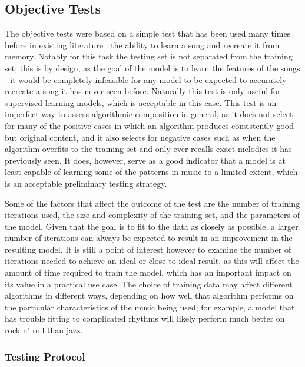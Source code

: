 \documentclass[ author={Stephen Livermore-Tozer},
				supervisor={Dr. Peter Flach},
				degree={MEng},
				title={Algorithmic Co-composition Using Machine Learning},
				subtitle={},
				type={research},
				year={2016} ]{dissertation}
\begin{document}
	\subsection{Objective Tests}
	\label{sec:objective-analysis}
	
	The objective tests were based on a simple test that has been used many times before in existing literature \cite{todd1989connectionist,franklin2006recurrent,paiement2007generative}: the ability to learn a song and recreate it from memory. Notably for this task the testing set is not separated from the training set; this is by design, as the goal of the model is to learn the features of the songs - it would be completely infeasible for any model to be expected to accurately recreate a song it has never seen before. Naturally this test is only useful for supervised learning models, which is acceptable in this case. This test is an imperfect way to assess algorithmic composition in general, as it does not select for many of the positive cases in which an algorithm produces consistently good but original content, and it also selects for negative cases such as when the algorithm overfits to the training set and only ever recalls exact melodies it has previously seen. It does, however, serve as a good indicator that a model is at least capable of learning some of the patterns in music to a limited extent, which is an acceptable preliminary testing strategy.
	
	Some of the factors that affect the outcome of the test are the number of training iterations used, the size and complexity of the training set, and the parameters of the model. Given that the goal is to fit to the data as closely as possible, a larger number of iterations can always be expected to result in an improvement in the resulting model. It is still a point of interest however to examine the number of iterations needed to achieve an ideal or close-to-ideal result, as this will affect the amount of time required to train the model, which has an important impact on its value in a practical use case. The choice of training data may affect different algorithms in different ways, depending on how well that algorithm performs on the particular characteristics of the music being used; for example, a model that has trouble fitting to complicated rhythms will likely perform much better on rock n' roll than jazz. 
	
	\subsubsection{Testing Protocol}
	
\end{document}
